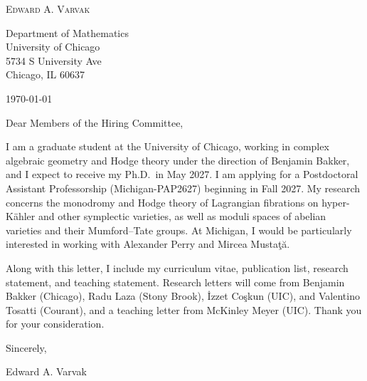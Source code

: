 \documentclass[12pt]{article}
\begin{document}
\begin{center}
  {\Large\textsc{Edward A. Varvak}}\\[10pt]
\end{center}

Department of Mathematics \\
University of Chicago \\
5734 S University Ave \\
Chicago, IL 60637

\today

Dear Members of the Hiring Committee,

I am a graduate student at the University of Chicago, working in complex
algebraic geometry and Hodge theory under the direction of Benjamin Bakker,
and I expect to receive my Ph.D.\ in May 2027. I am applying for a Postdoctoral
Assistant Professorship (\mbox{Michigan-PAP2627}) beginning in Fall 2027. My
research concerns the monodromy and Hodge theory of Lagrangian fibrations on
hyper-K\"ahler and other symplectic varieties, as well as moduli spaces of
abelian varieties and their Mumford--Tate groups. At Michigan, I would be
particularly interested in working with Alexander Perry and Mircea
Musta\c{t}\u{a}.

Along with this letter, I include my curriculum vitae, publication list,
research statement, and teaching statement. Research letters will come from
Benjamin Bakker (Chicago), Radu Laza (Stony Brook), \.{I}zzet Co\c{s}kun
(UIC), and Valentino Tosatti (Courant), and a teaching letter from McKinley
Meyer (UIC). Thank you for your consideration.

Sincerely,

Edward A. Varvak
\end{document}
